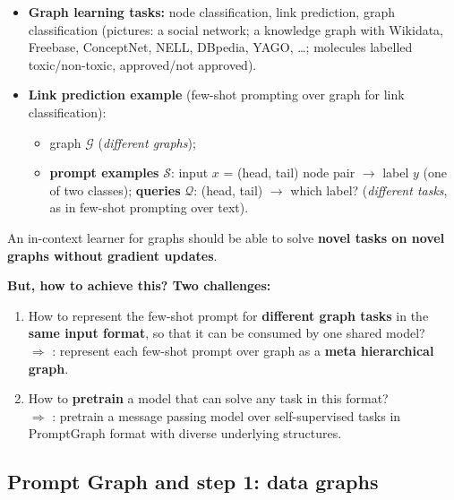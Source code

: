 \begin{itemize}
  \item \textbf{Graph learning tasks:} node classification, link prediction, graph
    classification (pictures: a social network; a knowledge graph with Wikidata,
    Freebase, ConceptNet, NELL, DBpedia, YAGO, \dots; molecules labelled
    toxic/non-toxic, approved/not approved).
  \item \textbf{Link prediction example} (few-shot prompting over graph for link
    classification):
    \begin{itemize}
      \item graph $\mathcal{G}$ (\emph{different graphs});
      \item \textbf{prompt examples} $\mathcal{S}$: input $x$ = (head, tail) node pair
        $\to$ label $y$ (one of two classes); \textbf{queries} $\mathcal{Q}$: (head, tail)
        $\to$ which label? (\emph{different tasks}, as in few-shot prompting over text).
    \end{itemize}
\end{itemize}
\begin{keyidea}
  An in-context learner for graphs should be able to solve \textbf{novel tasks on novel
  graphs without gradient updates}.
\end{keyidea}
\textbf{But, how to achieve this? Two challenges:}
\begin{enumerate}
  \item How to represent the few-shot prompt for \textbf{different graph tasks} in the
    \textbf{same input format}, so that it can be consumed by one shared model?\\
    $\Rightarrow$ : represent each few-shot prompt over graph as a
    \textbf{meta hierarchical graph}.
  \item How to \textbf{pretrain} a model that can solve any task in this format?\\
    $\Rightarrow$ : pretrain a message passing model over
    self-supervised tasks in PromptGraph format with diverse underlying structures.
\end{enumerate}

\subsection{Prompt Graph and step 1: data graphs}\label{sec:lec14-pg}

